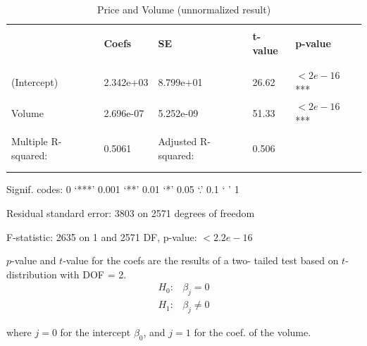 \documentclass[12pt]{article}
\begin{document}
\begin{table}[h!]
\begin{center}
	
\begin{threeparttable}
		\caption{Price and Volume (unnormalized result)}			

\begin{tabular}{lllll}
\\ [-1.8ex]
\hline
\hline \\[-1.8ex]
 & {\textbf {Coefs}} & {\textbf {SE}} & {\textbf {t-value}} & 
 {\textbf {p-value}}\\
\\ [-1.8ex]
\hline \\[-1.8ex]

 (Intercept) &2.342e+03  &8.799e+01   &26.62   &$<2e-16$ ***\\
 Volume      &2.696e-07  &5.252e-09   &51.33   &$<2e-16$ ***\\
\hline \\[-1.8ex]
Multiple R-squared:  &0.5061 &Adjusted R-squared:  &0.506\\
\\ [-1.8ex]
\hline \\[-1.8ex]

\end{tabular}
\begin{tablenotes}
\small
\item Signif. codes:  0 ‘***’ 0.001 ‘**’ 0.01 ‘*’ 0.05 ‘.’ 0.1 ‘ ’ 1\\
\item Residual standard error: 3803 on 2571 degrees of freedom\\
\item F-statistic:  2635 on 1 and 2571 DF,  p-value: $< 2.2e-16$\\
\end{tablenotes}


\end{threeparttable}
\end{center}
\end{table}



$ p $-value and $ t $-value for the coefs are the results of a two-
tailed test based on $ t $-distribution with DOF = 2.
\begin{align*}
H_0:& \beta_{j} = 0\\
H_1:& \beta_{j} \ne 0
\end{align*}

where $ j = 0 $ for the intercept $ \beta_0 $, and $ j = 1 $ for the
coef. of the volume.
\end{document}
